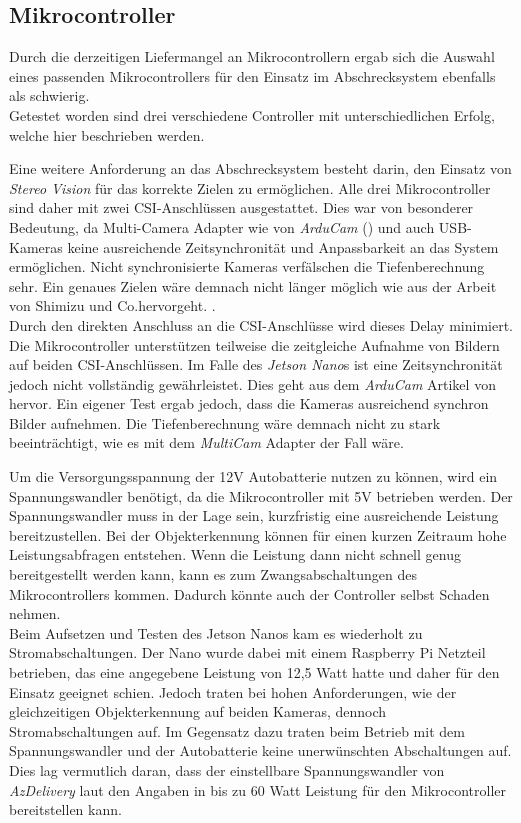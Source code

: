 \subsection{Mikrocontroller}

Durch die derzeitigen Liefermangel an Mikrocontrollern ergab sich die Auswahl eines passenden Mikrocontrollers für den Einsatz im Abschrecksystem ebenfalls als schwierig.\\
Getestet worden sind drei verschiedene Controller mit unterschiedlichen Erfolg, welche hier beschrieben werden.

Eine weitere Anforderung an das Abschrecksystem besteht darin, den Einsatz von \textit{Stereo Vision} für das korrekte Zielen zu ermöglichen. Alle drei Mikrocontroller sind daher mit zwei \ac{CSI}-Anschlüssen ausgestattet. Dies war von besonderer Bedeutung, da Multi-Camera Adapter wie von \textit{ArduCam} (\cite{arducam_multicam}) und auch USB-Kameras keine ausreichende Zeitsynchronität und Anpassbarkeit an das System ermöglichen. Nicht synchronisierte Kameras verfälschen die Tiefenberechnung sehr. Ein genaues Zielen wäre demnach nicht länger möglich wie aus der Arbeit von Shimizu und Co.hervorgeht. \cite{time_delay_sv}.
\\
Durch den direkten Anschluss an die \ac{CSI}-Anschlüsse wird dieses Delay minimiert. Die Mikrocontroller unterstützen teilweise die zeitgleiche Aufnahme von Bildern auf beiden \ac{CSI}-Anschlüssen. Im Falle des \textit{Jetson Nano}s ist eine Zeitsynchronität jedoch nicht vollständig gewährleistet. Dies geht aus dem \textit{ArduCam} Artikel von \cite{arduCam_sync_b01} hervor. Ein eigener Test ergab jedoch, dass die Kameras ausreichend synchron Bilder aufnehmen. Die Tiefenberechnung wäre demnach nicht zu stark beeinträchtigt, wie es mit dem \textit{MultiCam} Adapter der Fall wäre.

Um die Versorgungsspannung der 12V Autobatterie nutzen zu können, wird ein Spannungswandler benötigt, da die Mikrocontroller mit 5V betrieben werden. Der Spannungswandler muss in der Lage sein, kurzfristig eine ausreichende Leistung bereitzustellen. Bei der Objekterkennung können für einen kurzen Zeitraum hohe Leistungsabfragen entstehen. Wenn die Leistung dann nicht schnell genug bereitgestellt werden kann, kann es zum Zwangsabschaltungen des Mikrocontrollers kommen. Dadurch könnte auch der Controller selbst Schaden nehmen.
\\
Beim Aufsetzen und Testen des Jetson Nanos kam es wiederholt zu Stromabschaltungen. Der Nano wurde dabei mit einem Raspberry Pi Netzteil betrieben, das eine angegebene Leistung von 12,5 Watt hatte und daher für den Einsatz geeignet schien. Jedoch traten bei hohen Anforderungen, wie der gleichzeitigen Objekterkennung auf beiden Kameras, dennoch Stromabschaltungen auf. Im Gegensatz dazu traten beim Betrieb mit dem Spannungswandler und der Autobatterie keine unerwünschten Abschaltungen auf. Dies lag vermutlich daran, dass der einstellbare Spannungswandler von \textit{AzDelivery} laut den Angaben in \cite{am_spannungswandler} bis zu 60 Watt Leistung für den Mikrocontroller bereitstellen kann.

